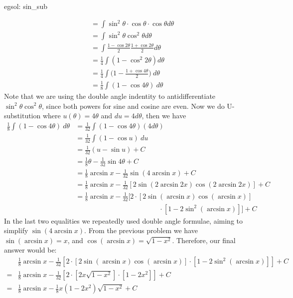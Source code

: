 \begin{egsol}[]{egsol: sin_sub}
\begin{enumerate}[a)]
\begin{align*}
            &= \int \sin^2\theta \cdot \cos \theta \cdot \cos\theta d\theta\\
            &= \int \sin^2\theta \cos^2\theta d\theta \\
            &= \int \frac{1-\cos 2\theta}{2}\frac{1+\cos 2\theta}{2} d\theta\\
            &= \frac{1}{4}\int (1-\cos^2 2\theta) d\theta\\
            &= \frac{1}{4}\int \Big(1-\frac{1+\cos 4\theta}{2}\Big)~d\theta\\
            &= \frac{1}{8}\int (1-\cos 4\theta)~d\theta
        \end{align*}
        Note that we are using the double angle indentity to antidifferentiate $\sin^2\theta \cos^2\theta$, since both powers for sine and cosine are even.  Now we do U-substitution where $u(\theta) = 4\theta$ and $du = 4d\theta$, then we have
        \begin{align*}
            \frac{1}{8}\int (1-\cos 4\theta)~d\theta &= \frac{1}{32}\int (1-\cos 4\theta)(4d\theta)\\
            &= \frac{1}{32}\int (1-\cos u)~du \\
            &= \frac{1}{32}(u-\sin u) + C\\
            &= \frac{1}{8}\theta - \frac{1}{32}\sin 4\theta + C\\
            &= \frac{1}{8}\arcsin x - \frac{1}{32}\sin (4\arcsin x) + C\\
            &= \frac{1}{8}\arcsin x - \frac{1}{32}[2\sin (2\arcsin 2x)\cos (2\arcsin 2x)] + C\\
            &= \frac{1}{8}\arcsin x - \frac{1}{32}[2 \cdot [2\sin (\arcsin x) \cos (\arcsin x)]\\
            & \qquad\qquad\qquad\qquad\qquad\qquad \cdot [1-2\sin^2 (\arcsin x)]] + C
        \end{align*}
        In the last two equalities we repeatedly used double angle formulae, aiming to simplify $\sin(4\arcsin x)$.  From the previous problem we have $\sin(\arcsin x) = x$, and $\cos(\arcsin x) = \sqrt{1-x^2}$.  Therefore, our final answer would be:
        \begin{align*}
            &\frac{1}{8}\arcsin x - \frac{1}{32}[2 \cdot [2\sin (\arcsin x) \cos (\arcsin x)] \cdot [1-2\sin^2 (\arcsin x)]] + C\\
            =&\frac{1}{8}\arcsin x - \frac{1}{32}[2 \cdot [2x\sqrt{1-x^2}] \cdot [1-2x^2]] + C\\
            =&\frac{1}{8}\arcsin x - \frac{1}{8}x(1-2x^2)\sqrt{1-x^2} + C

\end{align*}
\end{enumerate}
\end{egsol}
